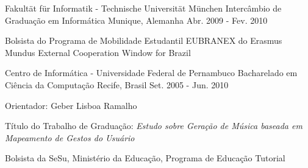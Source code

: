 \begin{cventries}
  \cventry
    {Fakultät für Informatik - Technische Universität München} %
    {Intercâmbio de Graduação em Informática} %
    {Munique, Alemanha} %
    {Abr. 2009 - Fev. 2010} %
    {
      \begin{cvitems} %
        \item {Bolsista do Programa de Mobilidade Estudantil EUBRANEX do Erasmus Mundus External Cooperation Window for Brazil}
      \end{cvitems}
    }

  \cventry
    {Centro de Informática - Universidade Federal de Pernambuco} %
    {Bacharelado em Ciência da Computação} %
    {Recife, Brasil} %
    {Set. 2005 - Jun. 2010} %
    {
      \begin{cvitems} %
      \item {Orientador: Geber Lisboa Ramalho}
        \item {Título do Trabalho de Graduação: \textit{Estudo sobre Geração de Música baseada em Mapeamento de Gestos do Usuário}}
        \item {Bolsista da SeSu, Ministério da Educação, Programa de Educação Tutorial}
      \end{cvitems}
    }

\end{cventries}